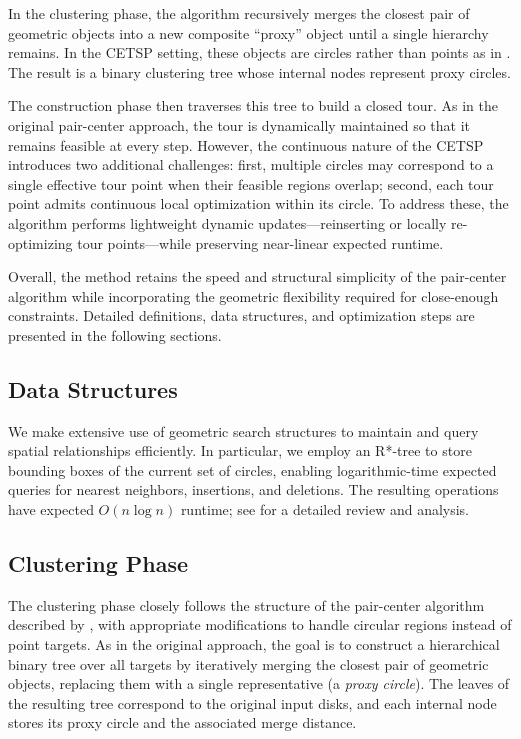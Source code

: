 \documentclass[11pt]{article}
\begin{document}
In the clustering phase, the algorithm recursively merges the closest pair of geometric objects into a new composite ``proxy'' object until a single hierarchy remains. In the CETSP setting, these objects are circles rather than points as in \textcite{Formella2024}. The result is a binary clustering tree whose internal nodes represent proxy circles.

The construction phase then traverses this tree to build a closed tour. As in the original pair-center approach, the tour is dynamically maintained so that it remains feasible at every step. However, the continuous nature of the CETSP introduces two additional challenges: first, multiple circles may correspond to a single effective tour point when their feasible regions overlap; second, each tour point admits continuous local optimization within its circle. To address these, the algorithm performs lightweight dynamic updates---reinserting or locally re-optimizing tour points---while preserving near-linear expected runtime.

Overall, the method retains the speed and structural simplicity of the pair-center algorithm while incorporating the geometric flexibility required for close-enough constraints. Detailed definitions, data structures, and optimization steps are presented in the following sections.

\subsection{Data Structures}

We make extensive use of geometric search structures to maintain and query spatial relationships efficiently. In particular, we employ an R*-tree to store bounding boxes of the current set of circles, enabling logarithmic-time expected queries for nearest neighbors, insertions, and deletions. The resulting operations have expected $O(n \log n)$ runtime; see \textcite{Formella2024} for a detailed review and analysis.

\subsection{Clustering Phase}

The clustering phase closely follows the structure of the pair-center algorithm described by \textcite{Formella2024}, with appropriate modifications to handle circular regions instead of point targets. As in the original approach, the goal is to construct a hierarchical binary tree over all targets by iteratively merging the closest pair of geometric objects, replacing them with a single representative (a \emph{proxy circle}). The leaves of the resulting tree correspond to the original input disks, and each internal node stores its proxy circle and the associated merge distance.
\end{document}
